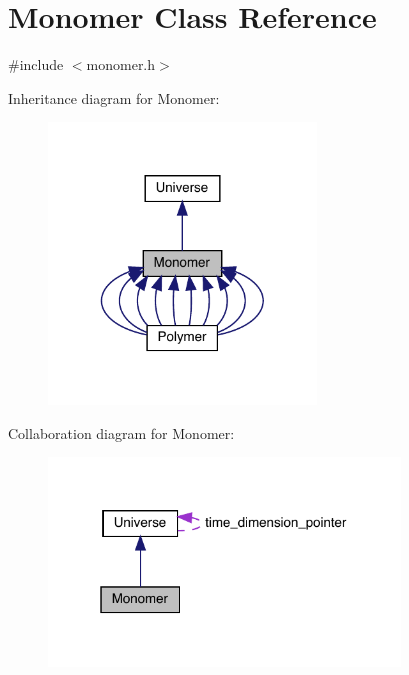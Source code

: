\hypertarget{class_monomer}{}\section{Monomer Class Reference}
\label{class_monomer}


{\ttfamily \#include $<$monomer.\+h$>$}



Inheritance diagram for Monomer\+:\nopagebreak
\begin{figure}[H]
\begin{center}
\leavevmode
\includegraphics[width=202pt]{class_monomer__inherit__graph}
\end{center}
\end{figure}


Collaboration diagram for Monomer\+:\nopagebreak
\begin{figure}[H]
\begin{center}
\leavevmode
\includegraphics[width=265pt]{class_monomer__coll__graph}
\end{center}
\end{figure}
